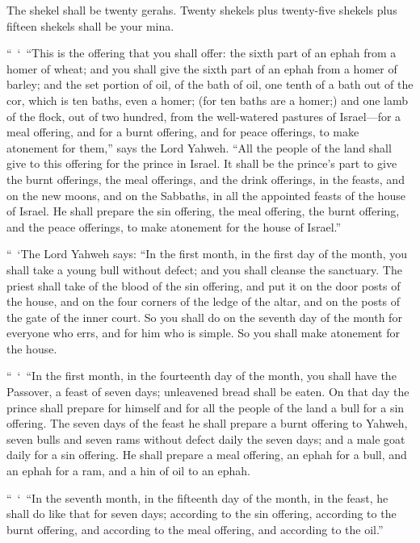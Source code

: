 {The shekel shall be twenty gerahs. Twenty shekels plus twenty-five shekels plus fifteen shekels shall be your mina.
\par }{\PP {}“ ‘ “This is the offering that you shall offer: the sixth part of an ephah from a homer of wheat; and you shall give the sixth part of an ephah from a homer of barley;
and the set portion of oil, of the bath of oil, one tenth of a bath out of the cor, which is ten baths, even a homer; (for ten baths are a homer;)
and one lamb of the flock, out of two hundred, from the well-watered pastures of Israel—for a meal offering, and for a burnt offering, and for peace offerings, to make atonement for them,” says the Lord Yahweh.
“All the people of the land shall give to this offering for the prince in Israel.
It shall be the prince’s part to give the burnt offerings, the meal offerings, and the drink offerings, in the feasts, and on the new moons, and on the Sabbaths, in all the appointed feasts of the house of Israel. He shall prepare the sin offering, the meal offering, the burnt offering, and the peace offerings, to make atonement for the house of Israel.”
\par }{\PP {}“ ‘The Lord Yahweh says: “In the first month, in the first day of the month, you shall take a young bull without defect; and you shall cleanse the sanctuary.
The priest shall take of the blood of the sin offering, and put it on the door posts of the house, and on the four corners of the ledge of the altar, and on the posts of the gate of the inner court.
So you shall do on the seventh day of the month for everyone who errs, and for him who is simple. So you shall make atonement for the house.
\par }{\PP {}“ ‘ “In the first month, in the fourteenth day of the month, you shall have the Passover, a feast of seven days; unleavened bread shall be eaten.
On that day the prince shall prepare for himself and for all the people of the land a bull for a sin offering.
The seven days of the feast he shall prepare a burnt offering to Yahweh, seven bulls and seven rams without defect daily the seven days; and a male goat daily for a sin offering.
He shall prepare a meal offering, an ephah for a bull, and an ephah for a ram, and a hin of oil to an ephah.
\par }{\PP {}“ ‘ “In the seventh month, in the fifteenth day of the month, in the feast, he shall do like that for seven days; according to the sin offering, according to the burnt offering, and according to the meal offering, and according to the oil.”

}
